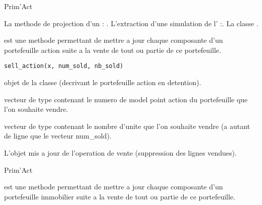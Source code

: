 \documentclass[a4paper]{book}
\begin{document}
%
\begin{Author}\relax
Prim'Act
\end{Author}
%
\begin{SeeAlso}\relax
La methode de projection d'un  : .
L'extraction d'une simulation de l' :.
La classe .
\end{SeeAlso}
%
\begin{Description}\relax
{} est une methode permettant de mettre a jour chaque composante d'un portefeuille action suite a la vente
de tout ou partie de ce portefeuille.
\end{Description}
%
\begin{Usage}
\begin{verbatim}
sell_action(x, num_sold, nb_sold)
\end{verbatim}
\end{Usage}
%
\begin{Arguments}
\begin{ldescription}
\item[\code{x}] objet de la classe  (decrivant le portefeuille action en detention).

\item[\code{num\_sold}] vecteur de type  contenant le numero de model point action du portefeuille que l'on souhaite vendre.

\item[\code{nb\_sold}] vecteur de type  contenant le nombre d'unite que l'on souhaite vendre (a autant de ligne que le vecteur num\_sold).
\end{ldescription}
\end{Arguments}
%
\begin{Value}
L'objet  mis a jour de l'operation de vente (suppression des lignes vendues).
\end{Value}
%
\begin{Author}\relax
Prim'Act
\end{Author}
%
\begin{Description}\relax
{} est une methode permettant de mettre a jour chaque composante d'un portefeuille immobilier suite a la vente
de tout ou partie de ce portefeuille.
\end{Description}
\end{document}
